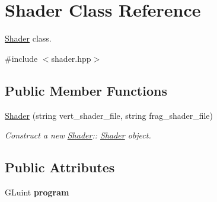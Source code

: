 \hypertarget{classShader}{}\section{Shader Class Reference}
\label{classShader}


\mbox{\hyperlink{classShader}{Shader}} class.  




{\ttfamily \#include $<$shader.\+hpp$>$}

\subsection*{Public Member Functions}
\begin{DoxyCompactItemize}
\item 
\mbox{\hyperlink{classShader_acfcee4e7b4f223f83d7bd5bce5cf36c0}{Shader}} (string vert\+\_\+shader\+\_\+file, string frag\+\_\+shader\+\_\+file)
\begin{DoxyCompactList}\small\item\em Construct a new \mbox{\hyperlink{classShader}{Shader}}\+:\+: \mbox{\hyperlink{classShader}{Shader}} object. \end{DoxyCompactList}\end{DoxyCompactItemize}
\subsection*{Public Attributes}
\begin{DoxyCompactItemize}
\item 
\mbox{\label{classShader_af036f983d35fe0f8f31dedc009b3645e}} 
G\+Luint {\bfseries program}
\end{DoxyCompactItemize}
